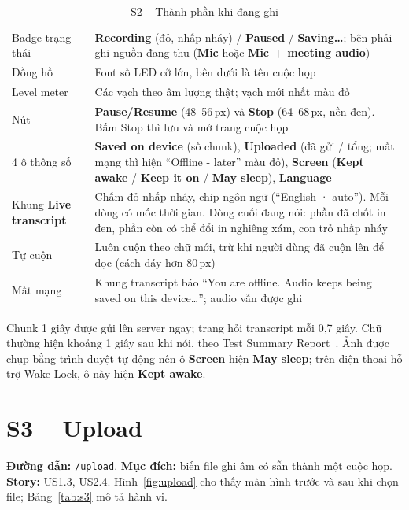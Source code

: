 \documentclass[12pt,a4paper]{report}
\newcommand{\ui}[1]{\textbf{#1}}
\begin{document}
\begin{table}[htbp]
  \centering
  \caption{S2 -- Thành phần khi đang ghi}
  \label{tab:s2-live}
  \small
  \begin{tabularx}{\linewidth}{@{}P{3.2cm}L@{}}
    \toprule
     &  \\
    \midrule
    Badge trạng thái & \ui{Recording} (đỏ, nhấp nháy) / \ui{Paused} / \ui{Saving\ldots}; bên phải ghi nguồn đang
      thu (\ui{Mic} hoặc \ui{Mic + meeting audio}) \\
    Đồng hồ & Font số LED cỡ lớn, bên dưới là tên cuộc họp \\
    Level meter & Các vạch theo âm lượng thật; vạch mới nhất màu đỏ \\
    Nút & \ui{Pause/Resume} (48--56\,px) và \ui{Stop} (64--68\,px, nền đen). Bấm Stop thì lưu và mở trang cuộc họp \\
    4 ô thông số & \ui{Saved on device} (số chunk), \ui{Uploaded} (đã gửi / tổng; mất mạng thì hiện ``Offline -
      later'' màu đỏ), \ui{Screen} (\ui{Kept awake} / \ui{Keep it on} / \ui{May sleep}), \ui{Language} \\
    Khung \ui{Live transcript} & Chấm đỏ nhấp nháy, chip ngôn ngữ (``English · auto''). Mỗi dòng có mốc thời gian.
      Dòng cuối đang nói: phần đã chốt in đen, phần còn có thể đổi in nghiêng xám, con trỏ nhấp nháy \\
    Tự cuộn & Luôn cuộn theo chữ mới, trừ khi người dùng đã cuộn lên để đọc (cách đáy hơn 80\,px) \\
    Mất mạng & Khung transcript báo ``You are offline. Audio keeps being saved on this device\ldots''; audio vẫn
      được ghi \\
    \bottomrule
  \end{tabularx}
\end{table}

Chunk 1 giây được gửi lên server ngay; trang hỏi transcript mỗi 0,7 giây. Chữ thường hiện khoảng 1 giây sau khi
nói, theo Test Summary Report~\cite{qtd}. Ảnh được chụp bằng trình duyệt tự động nên ô \ui{Screen} hiện
\ui{May sleep}; trên điện thoại hỗ trợ Wake Lock, ô này hiện \ui{Kept awake}.

\section{S3 -- Upload}

\textbf{Đường dẫn:} \texttt{/upload}. \textbf{Mục đích:} biến file ghi âm có sẵn thành một cuộc họp.
\textbf{Story:} US1.3, US2.4. Hình~\ref{fig:upload} cho thấy màn hình trước và sau khi chọn file;
Bảng~\ref{tab:s3} mô tả hành vi.
\end{document}
